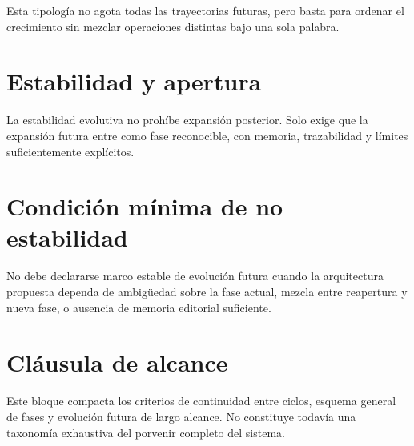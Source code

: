 \begin{observation}
Esta tipología no agota todas las trayectorias futuras, pero basta para ordenar el crecimiento sin mezclar operaciones distintas bajo una sola palabra.
\end{observation}

\section{Estabilidad y apertura}
\begin{observation}
La estabilidad evolutiva no prohíbe expansión posterior. Solo exige que la expansión futura entre como fase reconocible, con memoria, trazabilidad y límites suficientemente explícitos.
\end{observation}

\section{Condición mínima de no estabilidad}
\begin{definition}
No debe declararse marco estable de evolución futura cuando la arquitectura propuesta dependa de ambigüedad sobre la fase actual, mezcla entre reapertura y nueva fase, o ausencia de memoria editorial suficiente.
\end{definition}

\section{Cláusula de alcance}
\begin{observation}
Este bloque compacta los criterios de continuidad entre ciclos, esquema general de fases y evolución futura de largo alcance. No constituye todavía una taxonomía exhaustiva del porvenir completo del sistema.
\end{observation}

